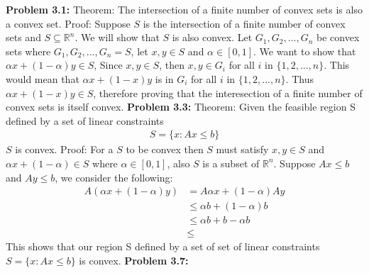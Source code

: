 \documentclass{article}
\begin{document}
\break \break
\textbf{Problem 3.1:} Theorem: The intersection of a finite number of convex sets is also a convex set.
\newline Proof: Suppose $S$ is the intersection of a finite number of convex sets and $S \subseteq \mathbb{R}^n$. We will show that $S$ is also convex. Let $G_1, G_2, ... , G_n$ be convex sets where $G_1, G_2, ... , G_n = S$, let $x, y \in S$ and $\alpha \in [0,1]$. We want to show that $\alpha x + (1-\alpha)y \in S$, Since $x,y \in S$, then $x,y \in G_i$ for all $i$ in $ \{1, 2, ..., n\} $. This would mean that $\alpha x + (1 - x)y$ is in $G_i$ for all $i$ in $\{1,2,...,n\}$. Thus $\alpha x + (1 - x)y \in S$, therefore proving that the interesection of a finite number of convex sets is itself convex.
\break
\break
\textbf{Problem 3.3:} Theorem: Given the feasible region S defined by a set of linear constraints
\begin{align*}
    S = \{ x : Ax \leq b \}
\end{align*}
$S$ is convex.
\newline Proof: For a $S$ to be convex then $S$ must satisfy $x,y \in S$ and $\alpha x + (1 - \alpha) \in S$ where $\alpha \in [0,1]$, also $S$ is a subset of $\mathbb{R}^n$.  Suppose $Ax \leq b$ and $Ay \leq b$, we consider the following:
\begin{align*}
    A(\alpha x + (1 - \alpha)y) & = A\alpha x + (1 - \alpha)Ay \\
    & \leq \alpha b + (1 - \alpha)b \\
    & \leq \alpha b + b - \alpha b \\
    & \leq  
\end{align*}
This shows that our region S defined by a set of set of linear constraints $S = \{ x : Ax \leq b \}$ is convex.
\break
\break
\textbf{Problem 3.7:}
\end{document}
